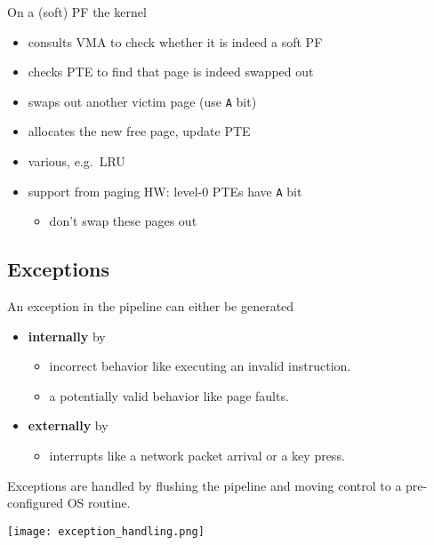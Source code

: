 \newpar{}

On a (soft) PF the kernel
\begin{itemize}
    \item consults VMA to check whether it is indeed a soft PF
    \item checks PTE to find that page is indeed swapped out
    \item swaps out another victim page (use \texttt{A} bit)
    \item allocates the new free page, update PTE
\end{itemize}

\newpar{}

\begin{itemize}
    \item various, e.g.\ LRU
    \item support from paging HW: level-0 PTEs have \texttt{A} bit
          \begin{itemize}
              \item don't swap these pages out
          \end{itemize}
\end{itemize}

\subsection{Exceptions}\label{exceptions}
An exception in the pipeline can either be generated
\begin{itemize}
    \item \textbf{internally} by
          \begin{itemize}
              \item incorrect behavior like executing an invalid instruction.
              \item a potentially valid behavior like page faults.
          \end{itemize}
    \item \textbf{externally} by
          \begin{itemize}
              \item interrupts like a network packet arrival or a key press.
          \end{itemize}
\end{itemize}

Exceptions are handled by flushing the pipeline and moving control to a pre-configured OS routine.

\begin{center}
    \texttt{[image: exception\_handling.png]}
\end{center}

